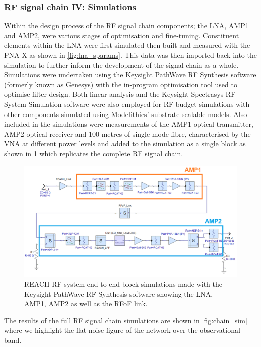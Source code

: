 \subsubsection{RF signal chain IV: Simulations}
Within the design process of the RF signal chain components; the LNA, AMP1 and AMP2, were various stages of optimisation and fine-tuning. Constituent elements within the LNA were first simulated then built and measured with the PNA-X as shown in \cref{fig:lna_sparams}. This data was then imported back into the simulation to further inform the development of the signal chain as a whole. Simulations were undertaken using the Keysight PathWave RF Synthesis software (formerly known as Genesys) with the in-program optimisation tool used to optimise filter design. Both linear analysis and the Keysight Spectrasys RF System Simulation software were also employed for RF budget simulations with other components simulated using Modelithics’ substrate scalable models. Also included in the simulations were measurements of the AMP1 optical transmitter, AMP2 optical receiver and 100 metres of single-mode fibre, characterised by the VNA at different power levels and added to the simulation as a single block as shown in \cref{fig:chain_block_diag} which replicates the complete RF signal chain.
\begin{figure}
    \centering
    \includegraphics[width=\textwidth]{chain_block_diag}
    \caption{REACH RF system end-to-end block simulations made with the Keysight PathWave RF Synthesis software showing the LNA, AMP1, AMP2 as well as the RFoF link.}
    \label{fig:chain_block_diag}
\end{figure}
The results of the full RF signal chain simulations are shown in \cref{fig:chain_sim} where we highlight the flat noise figure of the network over the observational band.
